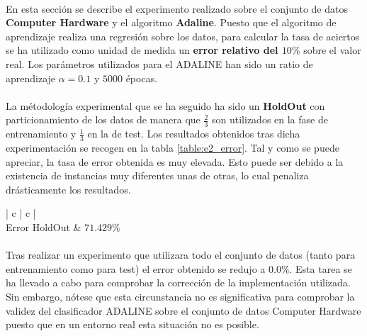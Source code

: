 \documentclass{article}
\begin{document}
		\paragraph{}
		En esta sección se describe el experimento realizado sobre el conjunto de datos \textbf{Computer Hardware}\cite{dataset:computer_hardware} y el algoritmo \textbf{Adaline}. Puesto que el algoritmo de aprendizaje realiza una regresión sobre los datos, para calcular la tasa de aciertos se ha utilizado como unidad de medida un \textbf{error relativo del $10\%$} sobre el valor real. Los parámetros utilizados para el ADALINE han sido un ratio de aprendizaje $\alpha = 0.1$ y $5000$ épocas.

		\paragraph{}
		La métodología experimental que se ha seguido ha sido un \textbf{HoldOut} con particionamiento de los datos de manera que $\frac{2}{3}$ son utilizados en la fase de entrenamiento y $\frac{1}{3}$ en la de test. Los resultados obtenidos tras dicha experimentación se recogen en la tabla \ref{table:e2_error}. Tal y como se puede apreciar, la tasa de error obtenida es muy elevada. Esto puede ser debido a la existencia de instancias muy diferentes unas de otras, lo cual penaliza drásticamente los resultados.


		\begin{table}[h]
			\centering
			\small
			\begin{tabu}{ | c | c | }
				\hline
				 \\ \hline
				Error HoldOut & $71.429\%$	 \\
				\hline
			\end{tabu}
			\caption{[TODO ]}
			\label{table:e2_error}
		\end{table}

		\paragraph{}
		Tras realizar un experimento que utilizara todo el conjunto de datos (tanto para entrenamiento como para test) el error obtenido se redujo a $0.0\%$. Esta tarea se ha llevado a cabo para comprobar la corrección de la implementación utilizada. Sin embargo, nótese que esta circunstancia no es significativa para comprobar la validez del clasificador ADALINE sobre el conjunto de datos Computer Hardware puesto que en un entorno real esta situación no es posible.



	\nocite{subject:taa}
  
  
\end{document}
